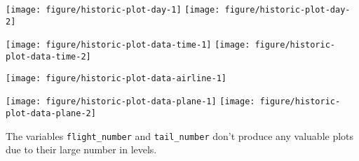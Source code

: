 \documentclass{article}\usepackage[]{graphicx}\usepackage[]{color}
\newenvironment{knitrout}{}{} %
\begin{document}
\begin{knitrout}
\color{fgcolor}

{\centering \texttt{[image: figure/historic-plot-day-1]} 
\texttt{[image: figure/historic-plot-day-2]} 

}



\end{knitrout}

\begin{knitrout}
\color{fgcolor}

{\centering \texttt{[image: figure/historic-plot-data-time-1]} 
\texttt{[image: figure/historic-plot-data-time-2]} 

}



\end{knitrout}
  
\begin{knitrout}
\color{fgcolor}

{\centering \texttt{[image: figure/historic-plot-data-airline-1]} 

}



\end{knitrout}
  
\begin{knitrout}
\color{fgcolor}

{\centering \texttt{[image: figure/historic-plot-data-plane-1]} 
\texttt{[image: figure/historic-plot-data-plane-2]} 

}



\end{knitrout}
  
The variables \verb+flight_number+ and \verb+tail_number+ don't produce any valuable plots due to their large number in levels.
\end{document}
